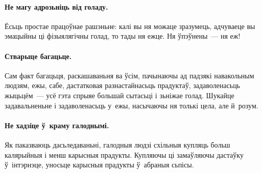 \paragraph{Не магу адрозьніць від голаду.}
Ёсьць простае працоўнае рашэньне: калі вы ня можаце зразумець, адчуваеце вы эмацыйны ці фізыялягічны голад, то тады ня ежце. Ня ўпэўнены~--- ня еж!

\paragraph{Стварыце багацьце.}
Сам факт багацьця, раскашаваньня ва ўсім, пачынаючы ад падзякі навакольным людзям, ежы, сабе, дастатковая разнастайнасьць прадуктаў, задаволенасьць жыцьцём~--- усё гэта спрыяе большай сытасьці і зьніжае голад. Шукайце задавальненьне і задаволенасьць у~ежы, насычаючы ня толькі цела, але й~розум.

\paragraph{Не хадзіце ў~краму галоднымі.}
Як паказваюць дасьледаваньні, галодныя людзі схільныя купляць больш калярыйныя і менш карысныя прадукты. Купляючы ці замаўляючы дастаўку ў~інтэрнэце, уносьце карысныя прадукты ў~абраныя сьпісы.
